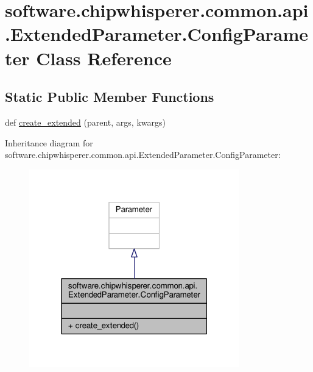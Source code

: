\hypertarget{classsoftware_1_1chipwhisperer_1_1common_1_1api_1_1ExtendedParameter_1_1ConfigParameter}{}\section{software.\+chipwhisperer.\+common.\+api.\+Extended\+Parameter.\+Config\+Parameter Class Reference}
\label{classsoftware_1_1chipwhisperer_1_1common_1_1api_1_1ExtendedParameter_1_1ConfigParameter}
\subsection*{Static Public Member Functions}
\begin{DoxyCompactItemize}
\item 
def \hyperlink{classsoftware_1_1chipwhisperer_1_1common_1_1api_1_1ExtendedParameter_1_1ConfigParameter_a0bc0ed2fc0f4ea21cc6f32da25bdc37f}{create\+\_\+extended} (parent, args, kwargs)
\end{DoxyCompactItemize}


Inheritance diagram for software.\+chipwhisperer.\+common.\+api.\+Extended\+Parameter.\+Config\+Parameter\+:\nopagebreak
\begin{figure}[H]
\begin{center}
\leavevmode
\includegraphics[width=259pt]{d9/d51/classsoftware_1_1chipwhisperer_1_1common_1_1api_1_1ExtendedParameter_1_1ConfigParameter__inherit__graph}
\end{center}
\end{figure}


